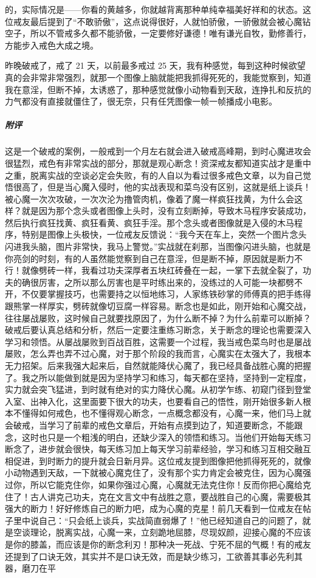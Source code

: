 \begin{case}
的，实际情况是——你看的黄越多，你就越背离那种单纯幸福美好祥和的状态。这位戒友最后提到了“不敢骄傲”，这点说得很好，人就怕骄傲，一骄傲就会被心魔钻空子，所以不管戒多久都不能骄傲，一定要修好谦德！唯有谦光自牧，勤修善行，方能步入戒色大成之境。
\end{case}

\begin{case}
    昨晚破戒了，戒了 21 天，以前最多戒过 25 天，我有种感觉，每到这种时候欲望真的会非常非常强烈，就那一个图像上脑就能把我抓得死死的，我能觉察到，知道我在意淫，但断不掉，太诱惑了，那种感觉就像小动物看到天敌，连挣扎和反抗的力气都没有直接就僵住了，很无奈，只有任凭图像一帧一帧播成小电影。
    \subparagraph{附评} 这是一个破戒的案例，一般戒到一个月左右就会进入破戒高峰期，到时心魔进攻会很猛烈，戒色有非常实战的部分，那就是观心断念！资深戒友都知道实战才是重中之重，脱离实战的空谈必定会失败，有的人自以为看过很多戒色文章，以为自己觉悟很高了，但是当心魔入侵时，他的实战表现和菜鸟没有区别，这就是纸上谈兵！被心魔一次次攻破，一次次沦为撸管肉机，像着了魔一样疯狂找黄，为什么会这样？就是因为那个念头或者图像上头时，没有立刻断掉，导致木马程序安装成功，然后执行疯狂找黄、疯狂看黄、疯狂手淫。那个念头或者图像就是入侵的木马程序，特别是图像上头极快，一位戒友反馈说：“我今天在车上，突然一个图片念头闪进我头脑，图片非常快，我马上警觉。”实战就在刹那，当图像闪进头脑，也就是你亮剑的时刻，有的人虽然能觉察到自己在意淫，但是断不掉，原因就是断力不行！就像劈砖一样，我看过功夫深厚者五块红砖叠在一起，一掌下去就全裂了，功夫的确很厉害，之所以那么厉害也是平时练出来的，没练过的人可能一块都劈不开，不仅要掌握技巧，也需要持之以恒地练习，人家练铁砂掌的师傅真的把手练得跟熊掌一样厚实，劈砖就像切豆腐一样容易。断念也是如此，刚开始和心魔交战，往往屡战屡败，这时候自己就要找原因了，为什么断不掉？为什么前辈可以断掉？破戒后要认真总结和分析，然后一定要注重练习断念，关于断念的理论也需要深入学习和领悟。从屡战屡败到百战百胜，这需要一个过程，我当戒色菜鸟时也是屡战屡败，怎么弄也弄不过心魔，对于那个阶段的我而言，心魔实在太强大了，我根本无力招架。后来我强大起来后，自然就能降伏心魔了，我已经具备战胜心魔的把握了。我之所以能做到就是因为坚持学习和练习，每天都在坚持，坚持到一定程度，实力就会突飞猛进，到时就有绝对的实力降伏心魔。从初学乍练、初窥门径到登堂入室、出神入化，这里面要下很大的功夫，也要看自己的悟性，刚开始很多新人根本不懂得如何戒色，也不懂得观心断念，一点概念都没有，心魔一来，他们马上就会破戒，当学习了前辈的戒色文章后，开始有点摸到边了，知道要断念，不能跟念，这时也只是一个粗浅的明白，还缺少深入的领悟和练习。当他们开始每天练习断念了，进步就会很快，每天练习加上每天学习前辈经验，学习和练习互相交融互相促进，到时断力的提升就会日新月异。这位戒友提到图像把他抓得死死的，就像小动物遇到天敌，一下就被心魔克住了，没有那个实力肯定会被克住，因为心魔强过你，所以它能克住你，如果你强过心魔，心魔就无法克住你！反而你把心魔给克住了！古人讲克己功夫，克在文言文中有战胜之意，要战胜自己的心魔，需要极其强大的断力！好好修炼自己的断力吧，成为心魔的克星！前几天看到一位戒友在帖子里中说自己：“只会纸上谈兵，实战简直弱爆了！”他已经知道自己的问题了，就是空谈理论，脱离实战，心魔一来，立刻跪地屈膝，尽现奴颜，迎接心魔的不应该是你的膝盖，而应该是你的断念利刃！那种决一死战、宁死不屈的气概！有的戒友还提到了口诀无效，其实并不是口诀无效，而是缺少练习，工欲善其事必先利其器，磨刀在平
\end{case}
